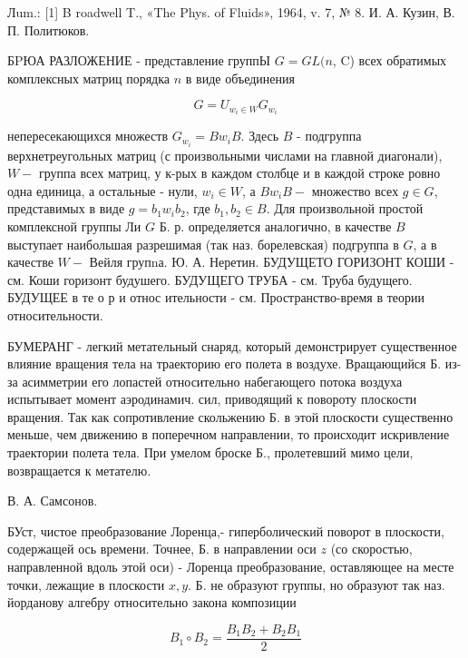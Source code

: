 \documentclass[10pt]{article}
\begin{document}
Лum.: [1] B roadwell T., «The Phys. of Fluids», 1964, v. 7, № 8. И. А. Кузин, В. П. Политюков.



БPЮА РАЗЛОЖЕНИЕ - представление группЫ $G=G L(n$, C) всех обратимых комплексных матриц порядка $n$ в виде объединения



\[

G=U_{w_{i} \in W} G_{w_{i}}

\]



непересекающихся множеств $G_{w_{i}}=B w_{i} B$. Здесь $B$ - подгруппа верхнетреугольных матриц (с произвольными числами на главной диагонали), $W-$ группа всех матриц, у к-рых в каждом столбце и в каждой строке ровно одна единица, а остальные - нули, $w_{i} \in W$, а $B w_{i} B-$ множество всех $g \in G$, представимых в виде $g=b_{1} w_{i} b_{2}$, где $b_{1}, b_{2} \in B$. Для произвольной простой комплексной группы Ли $G$ Б. р. определяется аналогично, в качестве $B$ выступает наибольшая разрешимая (так наз. борелевская) подгруппа в $G$, а в качестве $W-$ Вейля групnа. Ю. А. Неретин. БУДУЩЕТО ГОРИЗОНТ КОШИ - см. Коши горизонт будушего. БУДУЩЕГО ТРУБА - см. Труба будущего. БУДУЩЕЕ в те о р и относ ительности - см. Пространство-время в теории относительности.



БУМЕРАНГ - легкий метательный снаряд, который демонстрирует существенное влияние вращения тела на траекторию его полета в воздухе. Вращающийся Б. из-за асимметрии его лопастей относительно набегающего потока воздуха испытывает момент аэродинамич. сил, приводящий к повороту плоскости вращения. Так как сопротивление скольжению Б. в этой плоскости существенно меньше, чем движению в поперечном направлении, то происходит искривление траектории полета тела. При умелом броске Б., пролетевший мимо цели, возвращается к метателю.



В. А. Самсонов.



БУст, чистое преобразование Лоренца,- гиперболический поворот в плоскости, содержащей ось времени. Точнее, Б. в направлении оси $z$ (со скоростью, направленной вдоль этой оси) - Лоренца преобразование, оставляющее на месте точки, лежащие в плоскости $x, y$. Б. не образуют группы, но образуют так наз. йорданову алгебру относительно закона композиции



\[

B_{1} \circ B_{2}=\frac{B_{1} B_{2}+B_{2} B_{1}}{2}

\]
\end{document}
